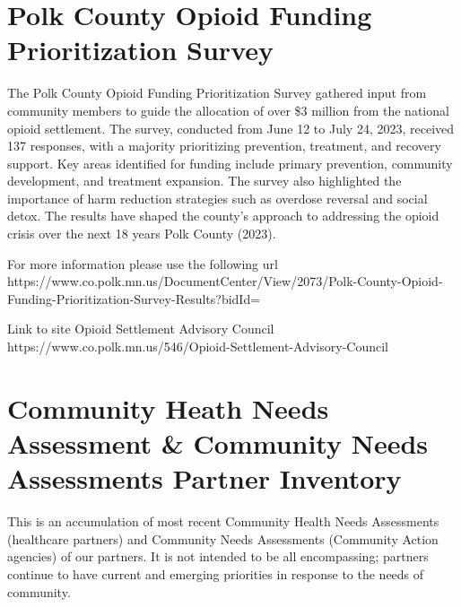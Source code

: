 \documentclass[
  a4paper,
  landscape]{scrreprt}
\begin{document}
\section{Polk County Opioid Funding Prioritization
Survey}\label{polk-county-opioid-funding-prioritization-survey}

The Polk County Opioid Funding Prioritization Survey gathered input from
community members to guide the allocation of over \$3 million from the
national opioid settlement. The survey, conducted from June 12 to July
24, 2023, received 137 responses, with a majority prioritizing
prevention, treatment, and recovery support. Key areas identified for
funding include primary prevention, community development, and treatment
expansion. The survey also highlighted the importance of harm reduction
strategies such as overdose reversal and social detox. The results have
shaped the county's approach to addressing the opioid crisis over the
next 18 years Polk County (2023).

For more information please use the following url
https://www.co.polk.mn.us/DocumentCenter/View/2073/Polk-County-Opioid-Funding-Prioritization-Survey-Results?bidId=

Link to site Opioid Settlement Advisory Council
https://www.co.polk.mn.us/546/Opioid-Settlement-Advisory-Council

\section{Community Heath Needs Assessment \& Community Needs Assessments
Partner
Inventory}\label{community-heath-needs-assessment-community-needs-assessments-partner-inventory}

This is an accumulation of most recent Community Health Needs
Assessments (healthcare partners) and Community Needs Assessments
(Community Action agencies) of our partners. It is not intended to be
all encompassing; partners continue to have current and emerging
priorities in response to the needs of community.
\end{document}
